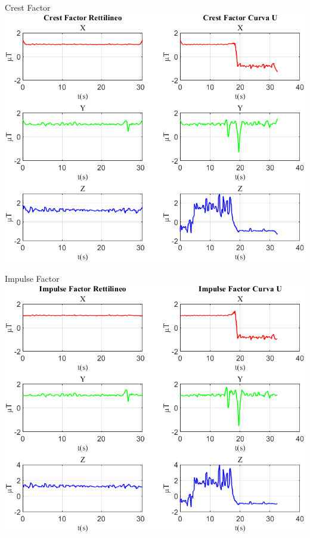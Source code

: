 \documentclass[beamer]{standalone}
\begin{document}
	\begin{frame}{{Crest Factor}}
		\centering\includegraphics[height=.8\textheight]{figure/Mag/Crest Factor}
	\end{frame}
	
	\begin{frame}{{Impulse Factor}}
		\centering\includegraphics[height=.8\textheight]{figure/Mag/Impulse Factor}
	\end{frame}
	
\end{document}
